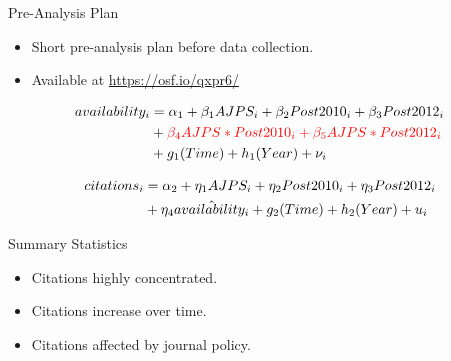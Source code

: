\documentclass{beamer}
\begin{document}
\begin{frame}{Pre-Analysis Plan}

\begin{itemize}
\item Short pre-analysis plan before data collection.
\item Available at \url{https://osf.io/qxpr6/}
\end{itemize}

\begin{align}\label{firststage} 
availability_i &= \alpha_1 +\beta_1 AJPS_i + \beta_2 Post2010_i + \beta_3 Post2012_i \\ \notag
& + {\color{red} \beta_4 AJPS*Post2010_i + \beta_5 AJPS*Post2012_i } \\
& + g_1(Time) + h_1(Year) +\nu_i \notag
\end{align}

\begin{align}
citations_i &=\alpha_2 +\eta_1 AJPS_i + \eta_2 Post2010_i+ \eta_3 Post2012_i \\ 
& + \eta_4 \hat{availability_i}+g_2(Time) + h_2(Year) +u_i \notag
\end{align}

\end{frame}
\begin{frame}{Summary Statistics}
\begin{itemize}
\item Citations highly concentrated.
\item Citations increase over time.
\item Citations affected by journal policy.
\end{itemize}
\end{frame}

{ %
    \begin{frame}[plain]
     \end{frame}
     
     \begin{frame}[plain]
     \end{frame}
    
    \begin{frame}[plain]
     \end{frame}
}
\end{document}
